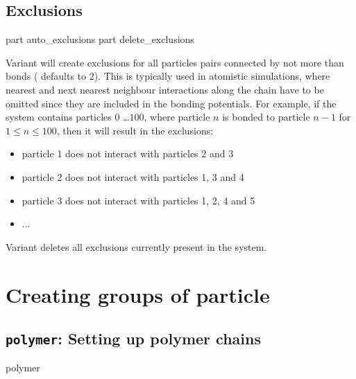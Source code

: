 \subsection{Exclusions}

\begin{essyntax}
   part auto\_exclusions 
   part delete\_exclusions
  \begin{features}
  \end{features}
\end{essyntax}


Variant  will create exclusions for all particles pairs
connected by not more than  bonds ( defaults to
2). This is typically used in atomistic simulations, where nearest and
next nearest neighbour interactions along the chain have to be omitted
since they are included in the bonding potentials. For example, if the
system contains particles $0$ \dots $100$, where particle $n$ is
bonded to particle $n-1$ for $1 \leq n \leq 100$, then it will result
in the exclusions:
\begin{itemize}
  \item particle 1 does not interact with particles 2 and 3
  \item particle 2 does not interact with particles 1, 3 and 4
  \item particle 3 does not interact with particles 1, 2, 4 and 5
  \item ...
\end{itemize}

Variant  deletes all exclusions currently present in the
system.

\section{Creating groups of particle}

\subsection{\texttt{polymer}: Setting up polymer chains}

\begin{essyntax}
  polymer 
   
  \\
  \begin{features}
  \end{features}
\end{essyntax}

